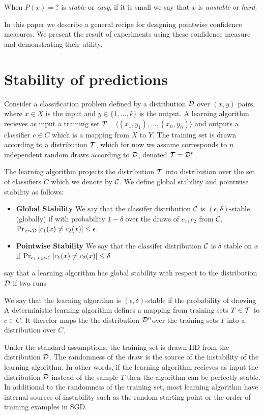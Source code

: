 \documentclass{article}
\begin{document}
When $P(x) = ?$  is {\em stable} or {\em easy}, if it is small we say that
$x$ is {\em unstable} or {\em hard}.

In this paper we describe a general recipe for designing pointwise
confidence measures. We present the result of experiments using these
confidence measure and demonstrating their utility.

\section{Stability of predictions}

Consider a classification problem defined by a distribution ${\cal D}$ over
$(x,y)$ pairs, where $x \in X$ is the input and $y \in \{1,\ldots,k\}$
is the output. A learning algorithm recieves as input a training set
$T=\langle(x_1,y_1),\ldots,(x_n,y_n) \rangle$
and outputs a classifier $c\in C$ which is a mapping from $X$ to
$Y$. The training set is drawn according to a distribution ${\cal T}$,
which for now we assume corresponds to $n$ independent random draws
according to ${\cal D}$, denoted ${\cal T} = {\cal D}^n$.

The learning algorithm projects the distribution ${\cal T}$ into
distribution over the set of classifiers $C$ which we denote by
${\cal C}$.  We define global stability and pointwise stability as
follows:
\begin{itemize}
\item {\bf Global Stability} We say that
the classifer distribution ${\cal C}$ is $(\epsilon,\delta)$-stable (globally) if with
probability $1-\delta$ over the draws of $c_1,c_2$ from ${\cal C}$,  $\mbox{Pr}_{x \sim
  {\cal D}}\left[ c_1(x)\neq c_2(x) \right]\leq \epsilon$.
\item {\bf Pointwise Stability} We say that the classifer distribution
  ${\cal C}$ is $\delta$ stable on $x$ if $\mbox{Pr}_{c_1,c_2 \sim {\cal C}}\left[ c_1(x)
    \neq c_2(x) \right] \leq \delta$
\end{itemize}

say that a learning algorithm has global stability with respect to
the distribution ${\cal D}$ if two runs 

We say that the learning
algorithm is $(\epsilon,\delta)$-stable if the probability of drawing 
A deterministic learning algorithm defines a mapping from
training sets $T \in {\cal T}$ to $c\in C$. It therefor maps the the
distribution ${\cal D}^n$over the training sets $T$ into a distribution
over $C$.

Under the standard assumptions, the training set is drawn IID from the
distribution ${\cal D}$. The randomness of the draw is the source of the
instability of the learning algorithm. In other words, if the learning
algorithm recieves as input the distribution ${\cal D}$ instead of the
sample $T$ then the algorithm can be perfectly stable. In additional
to the randomness of the training set, most learning algorithm have
internal sources of instability such as the random starting point
or the order of training examples in SGD.
\end{document}
